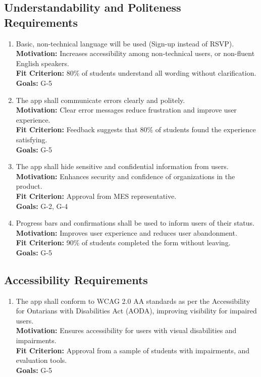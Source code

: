 \documentclass[12pt]{article}
\begin{document}
\subsection{Understandability and Politeness Requirements}
\begin{enumerate}[label=\bfseries UR-\arabic*:, wide=0pt, leftmargin=*, ref=\bfseries UR-\arabic*]
  \item \label{UR1} Basic, non-technical language will be used (Sign-up instead of RSVP).\\[2mm]
    {\bf Motivation:} Increases accessibility among non-technical users, or non-fluent English speakers.\\
    {\bf Fit Criterion:} 80\% of students understand all wording without clarification.\\
    {\bf Goals:} G-5
  \item \label{UR2} The app shall communicate errors clearly and politely.\\[2mm]
    {\bf Motivation:} Clear error messages reduce frustration and improve user experience.\\
    {\bf Fit Criterion:} Feedback suggests that 80\% of students found the experience satisfying.\\
    {\bf Goals:} G-5
  \item \label{UR3} The app shall hide sensitive and confidential information from users.\\[2mm]
    {\bf Motivation:} Enhances security and confidence of organizations in the product.\\
    {\bf Fit Criterion:} Approval from MES representative.\\
    {\bf Goals:} G-2, G-4
  \item Progress bars and confirmations shall be used to inform users of their status.\\[2mm]
    {\bf Motivation:} Improves user experience and reduces user abandonment.\\
    {\bf Fit Criterion:} 90\% of students completed the form without leaving.\\
    {\bf Goals:} G-5
\end{enumerate}

\subsection{Accessibility Requirements}
\begin{enumerate}[label=\bfseries AC-\arabic*:, wide=0pt, leftmargin=*,ref=\bfseries AC-\arabic*]
  \item \label{AC1} The app shall conform to WCAG 2.0 AA standards as per the Accessibility for Ontarians with Disabilities Act (AODA), improving visibility for impaired users.\\[2mm]
    {\bf Motivation:} Ensures accessibility for users with visual disabilities and impairments.\\
    {\bf Fit Criterion:} Approval from a sample of students with impairments, and evaluation tools.\\
    {\bf Goals:} G-5
\end{enumerate}
\end{document}
